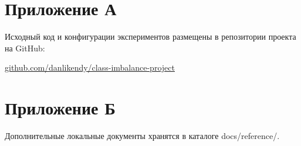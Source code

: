 \section*{Приложение А}
\label{sec:appendix-a}

Исходный код и конфигурации экспериментов размещены в репозитории проекта на GitHub:

\href{https://github.com/danlikendy/class-imbalance-project}{github.com/danlikendy/class-imbalance-project}

\section*{Приложение Б}
\label{sec:appendix-b}

Дополнительные локальные документы хранятся в каталоге docs/reference/.
